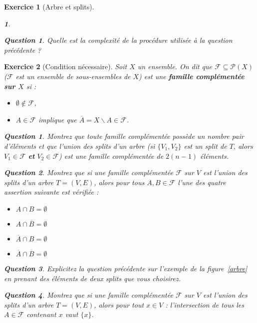 \documentclass{article}
\theoremstyle{exostyle}
\newtheorem{exo}{Exercice}
\theoremstyle{partiestyle}
\newtheorem{partie}{}[exo]
\theoremstyle{questionstyle}
\newtheorem{question}{Question}[exo]
\newtheorem{questionpartie}{Question}[partie]
\begin{document}
\begin{exo}[Arbre et splits]
\begin{partie}
		\begin{questionpartie}
			Quelle est la complexité de la procédure utilisée à la question précédente ?
		\end{questionpartie}
	\end{partie}	

\end{exo}

\begin{exo}[Condition nécessaire]
Soit $X$ un ensemble. On dit que $\mathcal{F} \subseteq \mathcal{P}(X)$ ($\mathcal{F}$ est un ensemble de sous-ensembles de $X$) est une {\bf\em famille complémentée sur $X$} si :
\begin{itemize}
	\item $\emptyset \notin \mathcal{F}$,
	\item $A \in \mathcal{F}$ implique que $\overline{A} = X \backslash A \in \mathcal{F}$.
\end{itemize}

\begin{question}
	Montrez que toute famille complémentée possède un nombre pair d'éléments et que l'union des splits d'un arbre  (si $\{V_1, V_2\}$ est un split de $T$, alors $V_1 \in \mathcal{F}$ {\bf et} $V_2 \in \mathcal{F}$) est une famille complémentée de $2(n-1)$ éléments.
\end{question}

\begin{question}
	\label{famille-buneman-1}
	Montrez que si une famille complémentée $\mathcal{F}$ sur $V$ est l'union des splits d'un arbre $T=(V, E)$, alors pour tous $A, B \in \mathcal{F}$ l'une des quatre assertion suivante est vérifiée :
\begin{itemize}
\item $A \cap B = \emptyset$
\item $A \cap \overline{B} = \emptyset$
\item $\overline{A} \cap B = \emptyset$
\item $\overline{A} \cap \overline{B} = \emptyset$
\end{itemize}	
	
\end{question}

\begin{question}
	Explicitez la question précédente sur l'exemple de la figure~\ref{arbre} en prenant des éléments de deux splits que vous choisirez.
\end{question}
\begin{question}
	\label{famille-buneman-2}
	Montrez que si une famille complémentée $\mathcal{F}$ sur $V$ est l'union des splits d'un arbre $T=(V, E)$, alors pour tout $x \in V$ : l'intersection de tous les $A \in \mathcal{F}$ contenant $x$ vaut $\{x\}$.
\end{question}

\end{exo}
\end{document}
